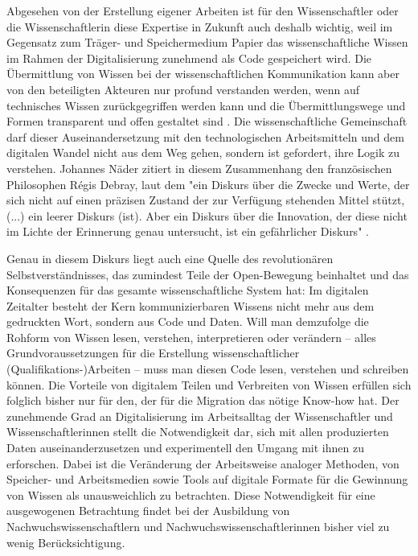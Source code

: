 Abgesehen von der Erstellung eigener Arbeiten ist für den Wissenschaftler oder die Wissenschaftlerin diese Expertise in Zukunft auch deshalb wichtig, weil im Gegensatz zum Träger- und Speichermedium Papier das wissenschaftliche Wissen im Rahmen der Digitalisierung zunehmend als Code gespeichert wird. Die Übermittlung von Wissen bei der wissenschaftlichen Kommunikation kann aber von den beteiligten Akteuren nur profund verstanden werden, wenn auf technisches Wissen zurückgegriffen werden kann und die Übermittlungswege und Formen transparent und offen gestaltet sind \cite{Davis_2011}. Die wissenschaftliche Gemeinschaft darf dieser Auseinandersetzung mit den technologischen Arbeitsmitteln und dem digitalen Wandel nicht aus dem Weg gehen, sondern ist gefordert, ihre Logik zu verstehen. Johannes Näder zitiert in diesem Zusammenhang den französischen Philosophen Régis Debray, laut dem "ein Diskurs über die Zwecke und Werte, der sich nicht auf einen präzisen Zustand der zur Verfügung stehenden Mittel stützt, (...) ein leerer Diskurs (ist). Aber ein Diskurs über die Innovation, der diese nicht im Lichte der Erinnerung genau untersucht, ist ein gefährlicher Diskurs" \cite[:117]{Naeder_2010} \cite[:246]{Debray_2003}.

Genau in diesem Diskurs liegt auch eine Quelle des revolutionären Selbstverständnisses, das zumindest Teile der Open-Bewegung beinhaltet und das Konsequenzen für das gesamte wissenschaftliche System hat: Im digitalen Zeitalter besteht der Kern kommunizierbaren Wissens nicht mehr aus dem gedruckten Wort, sondern aus Code und Daten. Will man demzufolge die Rohform von Wissen lesen, verstehen, interpretieren oder verändern – alles Grundvoraussetzungen für die Erstellung wissenschaftlicher (Qualifikations-)Arbeiten – muss man diesen Code lesen, verstehen und schreiben können. Die Vorteile von digitalem Teilen und Verbreiten von Wissen erfüllen sich folglich bisher nur für den, der für die Migration das nötige Know-how hat. Der zunehmende Grad an Digitalisierung im Arbeitsalltag der Wissenschaftler und Wissenschaftlerinnen stellt die Notwendigkeit dar, sich mit allen produzierten Daten auseinanderzusetzen und experimentell den Umgang mit ihnen zu erforschen. Dabei ist die Veränderung der Arbeitsweise analoger Methoden, von Speicher- und Arbeitsmedien sowie Tools auf digitale Formate für die Gewinnung von Wissen als unausweichlich zu betrachten. Diese Notwendigkeit für eine ausgewogenen Betrachtung findet bei der Ausbildung von Nachwuchswissenschaftlern und Nachwuchswissenschaftlerinnen bisher viel zu wenig Berücksichtigung.

